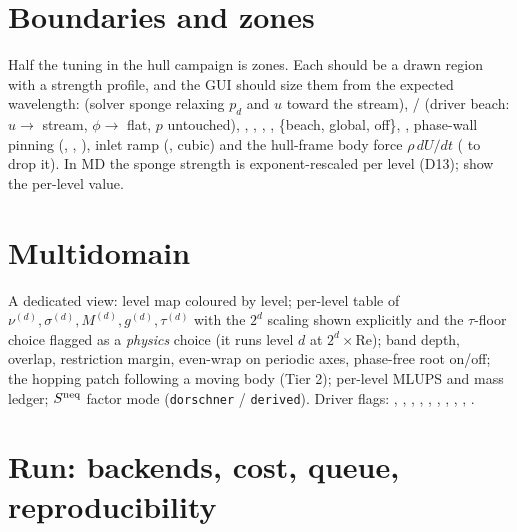 \documentclass[11pt,a4paper]{article}
\renewcommand{\Re}{\mathrm{Re}}
\newcommand{\pd}{p_d}
\newcommand{\code}[1]{\texttt{#1}}
\begin{document}
\section{Boundaries and zones}\label{sec:zones}
Half the tuning in the hull campaign is zones. Each should be a drawn region with a
strength profile, and the GUI should size them from the expected wavelength:
 (solver sponge relaxing $\pd$ and $u$ toward the stream),
 /  (driver beach: $u\to$ stream,
$\phi\to$ flat, $p$ untouched), , ,
, , 
\{beach, global, off\}, , phase-wall pinning
(, , ), inlet ramp
(, cubic) and the hull-frame body force $\rho\,dU/dt$
( to drop it). In MD the sponge strength is
exponent-rescaled per level (D13); show the per-level value.

\section{Multidomain}\label{sec:md}
A dedicated view: level map coloured by level; per-level table of
$\nu^{(d)},\sigma^{(d)},M^{(d)},g^{(d)},\tau^{(d)}$ with the $2^d$ scaling shown
explicitly and the $\tau$-floor choice flagged as a \emph{physics} choice (it runs
level $d$ at $2^d\times\Re$); band depth, overlap, restriction margin, even-wrap on
periodic axes, phase-free root on/off; the hopping patch following a moving body
(Tier 2); per-level MLUPS and mass ledger; $S^{\rm neq}$ factor mode
(\code{dorschner} / \code{derived}). Driver flags: , ,
, , , ,
, , ,
.

\section{Run: backends, cost, queue, reproducibility}\label{sec:run}
\end{document}
